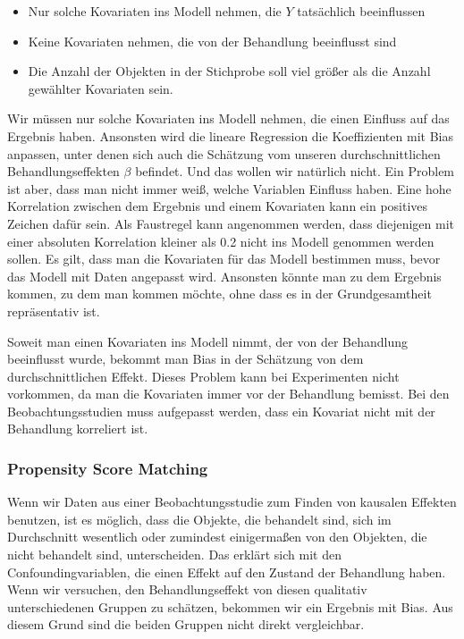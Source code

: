\documentclass[12pt,a4paper,twoside]{scrartcl}
\numberwithin{equation}{section}
\begin{document}
\begin{itemize}
  \item Nur solche Kovariaten ins Modell nehmen, die $Y$ tatsächlich beeinflussen 
  \item Keine Kovariaten nehmen, die von der Behandlung beeinflusst sind
  \item Die Anzahl der Objekten in der Stichprobe soll viel größer als die Anzahl gewählter Kovariaten sein.
\end{itemize}

\noindent
Wir müssen nur solche Kovariaten ins Modell nehmen, die einen Einfluss auf das Ergebnis haben. Ansonsten wird die lineare Regression die Koeffizienten mit Bias anpassen, unter denen sich auch die Schätzung vom unseren durchschnittlichen Behandlungseffekten $\beta$ befindet. Und das wollen wir natürlich nicht. Ein Problem ist aber, dass man nicht immer weiß, welche Variablen Einfluss haben. Eine hohe Korrelation zwischen dem Ergebnis und einem Kovariaten kann ein positives Zeichen dafür sein. Als Faustregel kann angenommen werden, dass diejenigen mit einer absoluten Korrelation kleiner als 0.2 nicht ins Modell genommen werden sollen. Es gilt, dass man die Kovariaten für das Modell bestimmen muss, bevor das Modell mit Daten angepasst wird. Ansonsten könnte man zu dem Ergebnis kommen, zu dem man kommen möchte, ohne dass es in der Grundgesamtheit repräsentativ ist\cite{cox1982biometrics}\cite{WinLin}. \par

\noindent
Soweit man einen Kovariaten ins Modell nimmt, der von der Behandlung beeinflusst wurde, bekommt man Bias in der Schätzung von dem durchschnittlichen Effekt. Dieses Problem kann bei Experimenten nicht vorkommen, da man die Kovariaten immer vor der Behandlung bemisst. Bei den Beobachtungsstudien muss aufgepasst werden, dass ein Kovariat nicht mit der Behandlung korreliert ist.\cite{LinDol}\par

\subsubsection{Propensity Score Matching}\label{subsubsec:propensityScoreMatching}
Wenn wir Daten aus einer Beobachtungsstudie zum Finden von kausalen Effekten benutzen, ist es möglich, dass die Objekte, die behandelt sind, sich im Durchschnitt wesentlich oder zumindest einigermaßen von den Objekten, die nicht behandelt sind, unterscheiden. Das erklärt sich mit den Confoundingvariablen, die einen Effekt auf den Zustand der Behandlung haben. Wenn wir versuchen, den Behandlungseffekt von diesen qualitativ unterschiedenen Gruppen zu schätzen, bekommen wir ein Ergebnis mit Bias. Aus diesem Grund sind die beiden Gruppen nicht direkt vergleichbar.\par
\end{document}
